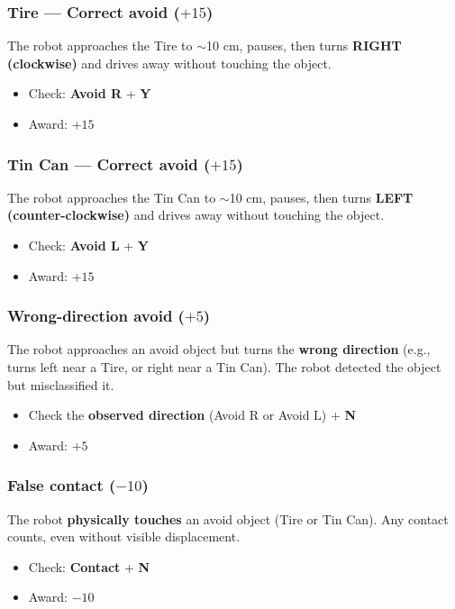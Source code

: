 \documentclass[a4]{article}
\begin{document}
\subsubsection*{Tire --- Correct avoid ($+15$)}
The robot approaches the Tire to $\sim$10 cm, pauses, then turns \textbf{RIGHT (clockwise)} and drives away without touching the object.
\begin{itemize}
    \item Check: \textbf{Avoid R} + \textbf{Y}
    \item Award: $+15$
\end{itemize}

\subsubsection*{Tin Can --- Correct avoid ($+15$)}
The robot approaches the Tin Can to $\sim$10 cm, pauses, then turns \textbf{LEFT (counter-clockwise)} and drives away without touching the object.
\begin{itemize}
    \item Check: \textbf{Avoid L} + \textbf{Y}
    \item Award: $+15$
\end{itemize}

\subsubsection*{Wrong-direction avoid ($+5$)}
The robot approaches an avoid object but turns the \textbf{wrong direction} (e.g., turns left near a Tire, or right near a Tin Can). The robot detected the object but misclassified it.
\begin{itemize}
    \item Check the \textbf{observed direction} (Avoid R or Avoid L) + \textbf{N}
    \item Award: $+5$
\end{itemize}

\subsubsection*{False contact ($-10$)}
The robot \textbf{physically touches} an avoid object (Tire or Tin Can). Any contact counts, even without visible displacement.
\begin{itemize}
    \item Check: \textbf{Contact} + \textbf{N}
    \item Award: $-10$
\end{itemize}
\end{document}
